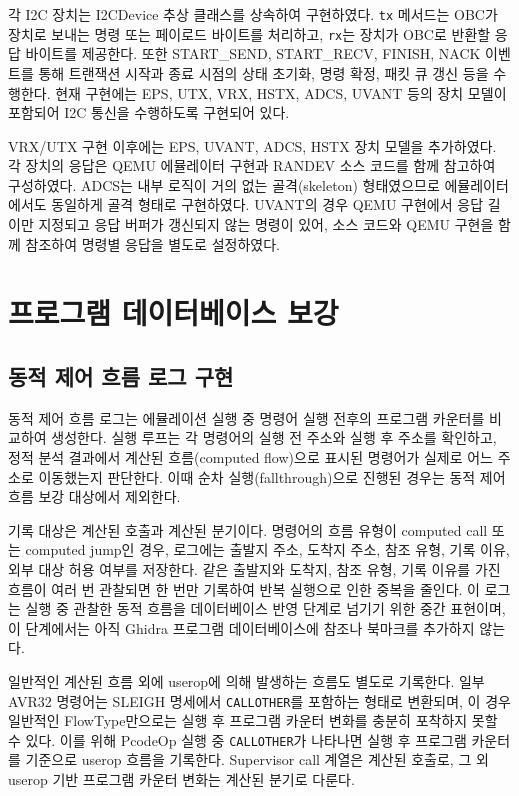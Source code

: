 \documentclass[master,korean,final]{kaist-ucs}
\begin{document}
각 I2C 장치는 I2CDevice 추상 클래스를 상속하여 구현하였다. \texttt{tx} 메서드는 OBC가 장치로 보내는 명령 또는 페이로드 바이트를 처리하고, \texttt{rx}는 장치가 OBC로 반환할 응답 바이트를 제공한다. 또한 START\_SEND, START\_RECV, FINISH, NACK 이벤트를 통해 트랜잭션 시작과 종료 시점의 상태 초기화, 명령 확정, 패킷 큐 갱신 등을 수행한다. 현재 구현에는 EPS, UTX, VRX, HSTX, ADCS, UVANT 등의 장치 모델이 포함되어 I2C 통신을 수행하도록 구현되어 있다.

VRX/UTX 구현 이후에는 EPS, UVANT, ADCS, HSTX 장치 모델을 추가하였다. 각 장치의 응답은 QEMU 에뮬레이터 구현과 RANDEV 소스 코드를 함께 참고하여 구성하였다. ADCS는 내부 로직이 거의 없는 골격(skeleton) 형태였으므로 에뮬레이터에서도 동일하게 골격 형태로 구현하였다. UVANT의 경우 QEMU 구현에서 응답 길이만 지정되고 응답 버퍼가 갱신되지 않는 명령이 있어, 소스 코드와 QEMU 구현을 함께 참조하여 명령별 응답을 별도로 설정하였다.

\section{프로그램 데이터베이스 보강}

\subsection{동적 제어 흐름 로그 구현}

동적 제어 흐름 로그는 에뮬레이션 실행 중 명령어 실행 전후의 프로그램 카운터를 비교하여 생성한다. 실행 루프는 각 명령어의 실행 전 주소와 실행 후 주소를 확인하고, 정적 분석 결과에서 계산된 흐름(computed flow)으로 표시된 명령어가 실제로 어느 주소로 이동했는지 판단한다. 이때 순차 실행(fallthrough)으로 진행된 경우는 동적 제어 흐름 보강 대상에서 제외한다.

기록 대상은 계산된 호출과 계산된 분기이다. 명령어의 흐름 유형이 computed call 또는 computed jump인 경우, 로그에는 출발지 주소, 도착지 주소, 참조 유형, 기록 이유, 외부 대상 허용 여부를 저장한다. 같은 출발지와 도착지, 참조 유형, 기록 이유를 가진 흐름이 여러 번 관찰되면 한 번만 기록하여 반복 실행으로 인한 중복을 줄인다. 이 로그는 실행 중 관찰한 동적 흐름을 데이터베이스 반영 단계로 넘기기 위한 중간 표현이며, 이 단계에서는 아직 Ghidra 프로그램 데이터베이스에 참조나 북마크를 추가하지 않는다.

일반적인 계산된 흐름 외에 userop에 의해 발생하는 흐름도 별도로 기록한다. 일부 AVR32 명령어는 SLEIGH 명세에서 \texttt{CALLOTHER}를 포함하는 형태로 변환되며, 이 경우 일반적인 FlowType만으로는 실행 후 프로그램 카운터 변화를 충분히 포착하지 못할 수 있다. 이를 위해 PcodeOp 실행 중 \texttt{CALLOTHER}가 나타나면 실행 후 프로그램 카운터를 기준으로 userop 흐름을 기록한다. Supervisor call 계열은 계산된 호출로, 그 외 userop 기반 프로그램 카운터 변화는 계산된 분기로 다룬다.
\end{document}
